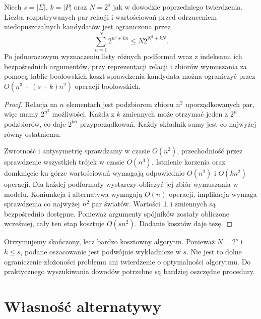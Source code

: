 \begin{stwierdzenie}
\label{prop:ncl-ipc-enumeration-complexity}
Niech $s=|\Sigma|$, $k=|P|$ oraz $N=2^s$
jak w dowodzie poprzedniego twierdzenia.
Liczba rozpatrywanych par relacji i wartościowań
przed odrzuceniem niedopuszczalnych kandydatów
jest ograniczona przez
\[
 \sum_{n=1}^N 2^{n^2+kn}\leq N2^{N^2+kN}.
\]
Po jednorazowym wyznaczeniu listy różnych podformuł
wraz z indeksami ich bezpośrednich argumentów,
przy reprezentacji relacji i zbiorów wymuszania
za pomocą tablic boolowskich koszt sprawdzenia
kandydata można ograniczyć przez
$O(n^3+(s+k)n^2)$ operacji boolowskich.
\end{stwierdzenie}
\begin{proof}
Relacja na $n$ elementach jest podzbiorem
zbioru $n^2$ uporządkowanych par, więc mamy
$2^{n^2}$ możliwości. Każda z $k$ zmiennych
może otrzymać jeden z $2^n$ podzbiorów,
co daje $2^{kn}$ przyporządkowań.
Każdy składnik sumy jest co najwyżej równy
ostatniemu.

Zwrotność i antysymetrię sprawdzamy w czasie
$O(n^2)$, przechodniość przez sprawdzenie
wszystkich trójek w czasie $O(n^3)$.
Istnienie korzenia oraz domknięcie ku górze
wartościowań wymagają odpowiednio $O(n^2)$
i $O(kn^2)$ operacji.
Dla każdej podformuły wystarczy obliczyć jej
zbiór wymuszania w modelu. Koniunkcja i alternatywa
wymagają $O(n)$ operacji, implikacja wymaga
sprawdzenia co najwyżej $n^2$ par światów.
Wartości $\bot$ i zmiennych są bezpośrednio
dostępne. Ponieważ argumenty spójników zostały
obliczone wcześniej, cały ten etap kosztuje
$O(sn^2)$. Dodanie kosztów daje tezę.
\end{proof}
Otrzymujemy skończony, lecz bardzo kosztowny
algorytm. Ponieważ $N=2^s$ i $k\leq s$,
podane oszacowanie jest podwójnie wykładnicze
w $s$. Nie jest to dolne ograniczenie złożoności
problemu ani twierdzenie o optymalności algorytmu.
Do praktycznego wyszukiwania dowodów potrzebne
są bardziej oszczędne procedury.

\section{Własność alternatywy}

